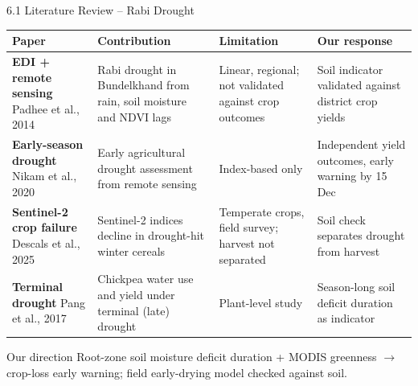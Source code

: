 \documentclass[aspectratio=169,10pt]{beamer}
\begin{document}
\begin{frame}{6.1 Literature Review -- Rabi Drought}
\footnotesize
\renewcommand{\arraystretch}{1.45}
\begin{tabularx}{\textwidth}{@{}p{3.3cm}YYY@{}}
\toprule
\textbf{Paper} & \textbf{Contribution} & \textbf{Limitation} & \textbf{Our response} \\ \midrule
\textbf{EDI + remote sensing} \newline Padhee et al., 2014 & Rabi drought in Bundelkhand from rain, soil moisture and NDVI lags & Linear, regional; not validated against crop outcomes & Soil indicator validated against district crop yields \\
\textbf{Early-season drought} \newline Nikam et al., 2020 & Early agricultural drought assessment from remote sensing & Index-based only & Independent yield outcomes, early warning by 15 Dec \\
\textbf{Sentinel-2 crop failure} \newline Descals et al., 2025 & Sentinel-2 indices decline in drought-hit winter cereals & Temperate crops, field survey; harvest not separated & Soil check separates drought from harvest \\
\textbf{Terminal drought} \newline Pang et al., 2017 & Chickpea water use and yield under terminal (late) drought & Plant-level study & Season-long soil deficit duration as indicator \\
\bottomrule
\end{tabularx}
\begin{block}{Our direction}
\footnotesize Root-zone soil moisture deficit duration + MODIS greenness $\rightarrow$ crop-loss early warning; field early-drying model checked against soil.
\end{block}
\end{frame}
\end{document}
